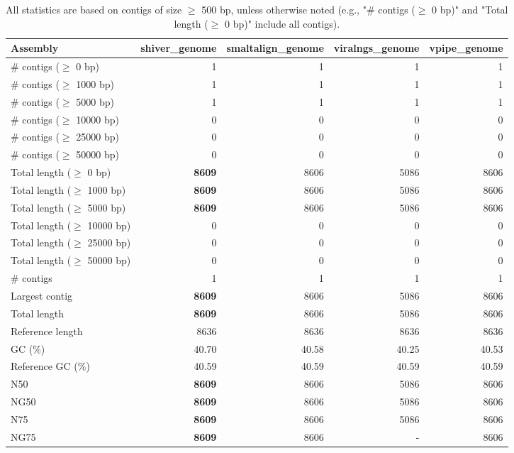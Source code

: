\documentclass[12pt,a4paper]{article}
\begin{document}
\begin{table}[ht]
\begin{center}
\caption{All statistics are based on contigs of size $\geq$ 500 bp, unless otherwise noted (e.g., "\# contigs ($\geq$ 0 bp)" and "Total length ($\geq$ 0 bp)" include all contigs).}
\begin{tabular}{|l*{4}{|r}|}
\hline
Assembly & shiver\_genome & smaltalign\_genome & viralngs\_genome & vpipe\_genome \\ \hline
\# contigs ($\geq$ 0 bp) & 1 & 1 & 1 & 1 \\ \hline
\# contigs ($\geq$ 1000 bp) & 1 & 1 & 1 & 1 \\ \hline
\# contigs ($\geq$ 5000 bp) & 1 & 1 & 1 & 1 \\ \hline
\# contigs ($\geq$ 10000 bp) & 0 & 0 & 0 & 0 \\ \hline
\# contigs ($\geq$ 25000 bp) & 0 & 0 & 0 & 0 \\ \hline
\# contigs ($\geq$ 50000 bp) & 0 & 0 & 0 & 0 \\ \hline
Total length ($\geq$ 0 bp) & {\bf 8609} & 8606 & 5086 & 8606 \\ \hline
Total length ($\geq$ 1000 bp) & {\bf 8609} & 8606 & 5086 & 8606 \\ \hline
Total length ($\geq$ 5000 bp) & {\bf 8609} & 8606 & 5086 & 8606 \\ \hline
Total length ($\geq$ 10000 bp) & 0 & 0 & 0 & 0 \\ \hline
Total length ($\geq$ 25000 bp) & 0 & 0 & 0 & 0 \\ \hline
Total length ($\geq$ 50000 bp) & 0 & 0 & 0 & 0 \\ \hline
\# contigs & 1 & 1 & 1 & 1 \\ \hline
Largest contig & {\bf 8609} & 8606 & 5086 & 8606 \\ \hline
Total length & {\bf 8609} & 8606 & 5086 & 8606 \\ \hline
Reference length & 8636 & 8636 & 8636 & 8636 \\ \hline
GC (\%) & 40.70 & 40.58 & 40.25 & 40.53 \\ \hline
Reference GC (\%) & 40.59 & 40.59 & 40.59 & 40.59 \\ \hline
N50 & {\bf 8609} & 8606 & 5086 & 8606 \\ \hline
NG50 & {\bf 8609} & 8606 & 5086 & 8606 \\ \hline
N75 & {\bf 8609} & 8606 & 5086 & 8606 \\ \hline
NG75 & {\bf 8609} & 8606 & - & 8606 \\ \hline

\end{tabular}
\end{center}
\end{table}
\end{document}
